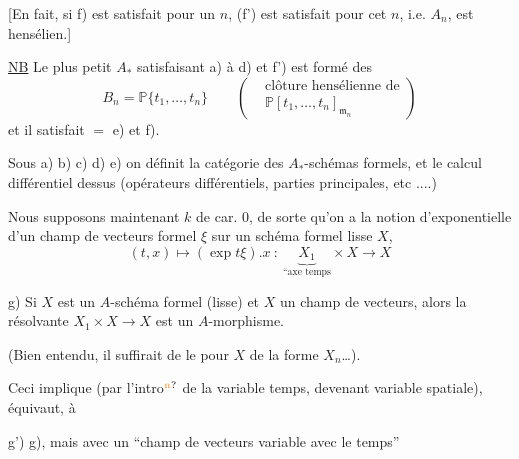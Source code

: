 [En fait, si f) est satisfait pour un $n$, (f') est satisfait pour cet $n$, i.e. $A_n$, est hensélien.]



\uline{NB} Le plus petit $A_*$ satisfaisant a) à d) et f') est formé des
\[
 B_n=\mathbb P\{t_1,\ldots,t_n\}\qquad
 \left(\begin{aligned}&\text{clôture hensélienne de}\\[-2pt]&\mathbb P[t_1,\ldots,t_n]_{\mathfrak m_n}\end{aligned}\right)
\]
et il satisfait $=$ e) et f).


Sous a) b) c) d) e) on définit la catégorie des $A_*$-schémas formels, et le calcul différentiel dessus (opérateurs différentiels, parties principales,  etc ....)

Nous supposons maintenant $k$ de car. $0$, de sorte qu'on a la notion d'exponentielle d'un champ de vecteurs formel $\xi$ sur  un schéma formel lisse $X$,
\[
 (t,x)\mapsto(\exp t\xi).x\ :\ \underbrace{X_1}_{\text{``axe temps}}\times X\longrightarrow X
\]


g) Si $X$ est un $A$-schéma formel (lisse) et $X$ un champ de vecteurs, alors la résolvante $X_1\times X\longrightarrow X$ est un $A$-morphisme.

(Bien entendu, il suffirait de le  pour $X$ de la forme $X_n$\ldots).

Ceci implique  (par l'intro$\unsure{^{\mathrm n}}$ de la variable temps, devenant variable spatiale),  équivaut, à

g')  g), mais avec un ``champ de vecteurs variable avec le temps''

